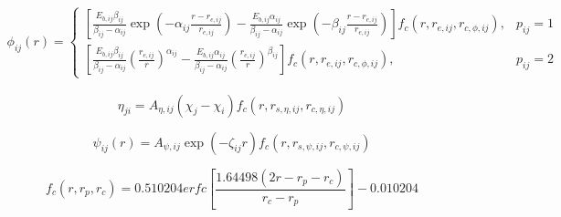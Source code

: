 


\begin{eqnarray*}
\phi_{ij}\left(r\right) = \left\{ \begin{array}{lr}
\left[\frac{E_{b,ij}\beta_{ij}}{\beta_{ij}-\alpha_{ij}}\exp\left(-\alpha_{ij} \frac{r-r_{e,ij}}{r_{e,ij}}\right)-\frac{E_{b,ij}\alpha_{ij}}{\beta_{ij}-\alpha_{ij}}\exp\left(-\beta_{ij} \frac{r-r_{e,ij}}{r_{e,ij}}\right)\right]f_c\left(r,r_{e,ij},r_{c,\phi,ij}\right),& p_{ij}=1 \\
\left[\frac{E_{b,ij}\beta_{ij}}{\beta_{ij}-\alpha_{ij}} \left(\frac{r_{e,ij}}{r}\right)^{\alpha_{ij}}  -\frac{E_{b,ij}\alpha_{ij}}{\beta_{ij}-\alpha_{ij}} \left(\frac{r_{e,ij}}{r}\right)^{\beta_{ij}}\right]f_c\left(r,r_{e,ij},r_{c,\phi,ij}\right),& p_{ij}=2
\end{array}
\right.
\end{eqnarray*}

$$
\eta_{ji} = A_{\eta,ij}\left(\chi_j-\chi_i\right)f_c\left(r,r_{s,\eta,ij},r_{c,\eta,ij}\right)
$$

$$
\psi_{ij}\left(r\right) = A_{\psi,ij}\exp\left(-\zeta_{ij}r\right)f_c\left(r,r_{s,\psi,ij},r_{c,\psi,ij}\right)
$$

$$
f_{c}\left(r,r_p,r_c\right) = 0.510204 erfc\left[\frac{1.64498\left(2r-r_p-r_c\right)}{r_c-r_p}\right] - 0.010204
$$


